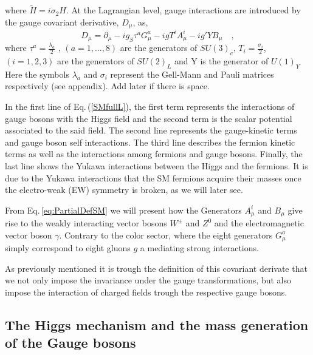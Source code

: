 %
where $\tilde{H}=i\sigma_2 H$. At the Lagrangian level, gauge interactions are introduced by the gauge covariant
derivative, $D_\mu$, as, 
%
\begin{equation}
\label{eq:PartialDefSM}
D_\mu = \partial_\mu - i g_S \tau^a G^a_\mu - i g T^i A^i_\mu - i g' Y B_\mu \quad ,  
\end{equation}
%
where $\tau^a= \frac{\lambda_a}{2}$ , $(a = 1, . . . , 8)$ are the generators of $SU (3)_c$, $T_i= \frac{\sigma_i}{2} $, $(i = 1, 2, 3)$ are the generators of $SU(2)_L$ and Y is the generator of $U(1)_Y$  Here the symbols $\lambda_a$ and $\sigma_i$ represent the Gell-Mann and Pauli matrices respectively (see appendix). {\color{blue} Add later if there is space}.

In the first line of Eq.\,(\ref{SMfullL}), the first term represents the interactions of gauge bosons with the Higgs field and the second term is the scalar potential associated to the said field. 
%
The second line represents the gauge-kinetic terms and gauge boson self interactions. The third line describes the fermion kinetic terms as well as the interactions among fermions and gauge bosons. Finally, the last line shows the Yukawa interactions between the Higgs and the fermions. It is due to the Yukawa interactions that the SM fermions acquire their masses once the electro-weak (EW) symmetry is broken, as we will later see.

From Eq.\,\ref{eq:PartialDefSM} we will present how the Generators $A^i_\mu$ and $B_\mu$ give rise to the weakly interacting vector bosons $W^\pm$ and $Z^0$ and the electromagnetic vector boson $\gamma$. Contrary to the color sector, where the eight generators $G^a_\mu$ simply correspond to eight gluons $g$ a mediating strong interactions. 

As previously mentioned it is trough the definition of this covariant derivate that we not only impose the invariance under the gauge transformations, but also impose the interaction of charged fields trough the respective gauge bosons. 

\subsection{The Higgs mechanism and the mass generation of the Gauge bosons}


